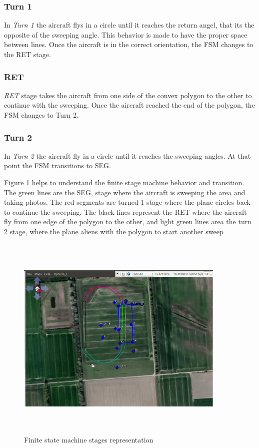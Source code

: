 \subsubsection{Turn 1}
In \textit{Turn 1} the aircraft flys in a circle until it reaches the return angel, that its the opposite of the sweeping angle. This behavior is made to have the proper space between lines. Once the aircraft is in the correct orientation, the FSM changes to the RET stage.
\subsubsection{RET}
\textit{RET} stage takes the aircraft from one side of the convex polygon to the other to continue with the sweeping. Once the aircraft reached the end of the polygon, the FSM changes to Turn 2.
\subsubsection{Turn 2}
In \textit{Turn 2} the aircraft fly in a circle until it reaches the sweeping angles. At that point the FSM transitions to SEG.

Figure \ref{fig:FSM_example} helps to understand the finite stage machine behavior and transition.  The green lines are the SEG, stage where the aircraft is sweeping the area and taking photos.  The red segments are turned 1 stage where the plane circles back to continue the sweeping. The black lines represent the RET where the aircraft fly from one edge of the polygon to the other, and light green lines area the turn 2 stage, where the plane aliens with the polygon to start another sweep 
\begin{figure}[H]
\centering
\includegraphics[width=10cm,height=10cm,keepaspectratio]{imagenes/FSM_example.png}
\caption{Finite state machine stages representation}
\label{fig:FSM_example}
\end{figure}

